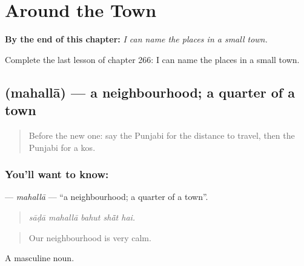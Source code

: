 
\chapter{Around the Town}
\label{ch:pa-a2-around-the-town}

\begin{chapteropening}
\textbf{By the end of this chapter:} \emph{I can name the places in a small town.}

Complete the last lesson of chapter 266: I can name the places in a small town.
\end{chapteropening}

\section[\texorpdfstring{\pa{ਮਹੱਲਾ} (mahallā)}{ਮਹੱਲਾ (mahallā)}]{ (mahallā) — a neighbourhood; a quarter of a town}

\label{lesson:PA-C266-mahalla}



\begin{quote}
Before the new one: say the Punjabi for the distance to travel, then the Punjabi for a kos.
\end{quote}

\subsection*{You'll want to know: }
\textbf{} — \emph{mahallā} — \textquotedblleft{}a neighbourhood; a quarter of a town\textquotedblright{}.

\begin{quote}
    
\end{quote}

\begin{quote}
\emph{sāḍā mahallā bahut shā̃t hai.}
\end{quote}

\begin{quote}
Our neighbourhood is very calm.
\end{quote}

A masculine noun.


